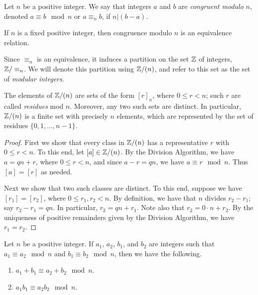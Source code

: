 \begin{dfn}
Let \(n\) be a positive integer. We say that integers \(a\) and \(b\) are \emph{congruent modulo \(n\)}, denoted \(a \equiv b \mod n\) or \(a \equiv_n b\), if \(n|(b-a)\).
\end{dfn}

\begin{prop}
If \(n\) is a fixed positive integer, then congruence modulo \(n\) is an equivalence relation. 
\end{prop}

Since \(\equiv_n\) is an equivalence, it induces a partition on the set \(\mathbb{Z}\) of integers, \(\mathbb{Z}/\equiv_n\). We will denote this partition using \(\mathbb{Z}/(n)\), and refer to this set as the set of \emph{modular integers}.

\begin{prop}
The elements of \(\mathbb{Z}/(n)\) are sets of the form \([r]_n\), where \(0 \leq r < n\); such \(r\) are called \emph{residues} mod \(n\). Moreover, any two such sets are distinct. In particular, \(\mathbb{Z}/(n)\) is a finite set with precisely \(n\) elements, which are represented by the set of residues \(\{0,1,\ldots,n-1\}\). 
\end{prop}

\begin{proof}
First we show that every class in \(\mathbb{Z}/(n)\) has a representative \(r\) with \(0 \leq r < n\). To this end, let \([a] \in \mathbb{Z}/(n)\). By the Division Algorithm, we have \(a = qn + r\), where \(0 \leq r < n\), and since \(a - r = qn\), we have \(a \equiv r \mod n\). Thus \([a] = [r]\) as needed.

Next we show that two such classes are distinct. To this end, suppose we have \([r_1] = [r_2]\), where \(0 \leq r_1, r_2 < n\). By definition, we have that \(n\) divides \(r_2 - r_1\); say \(r_2 - r_1 = qn\). In particular, \(r_2 = qn + r_1\). Note also that \(r_2 = 0 \cdot n + r_2\). By the uniqueness of positive remainders given by the Division Algorithm, we have \(r_1 = r_2\).
\end{proof}


\begin{prop}
Let \(n\) be a positive integer. If \(a_1\), \(a_2\), \(b_1\), and \(b_2\) are integers such that \(a_1 \equiv a_2 \mod n\) and \(b_1 \equiv b_2 \mod n\), then we have the following.
\begin{enumerate}
\item \(a_1 + b_1 \equiv a_2 + b_2 \mod n\).
\item \(a_1 b_1 \equiv a_2 b_2 \mod n\).
\end{enumerate}
\end{prop}

